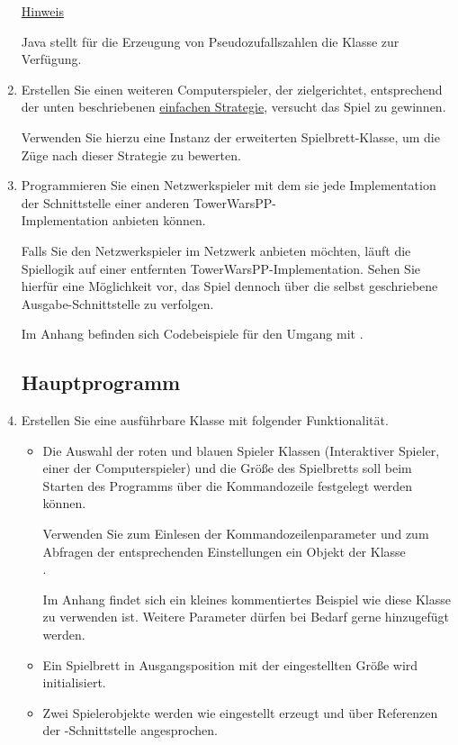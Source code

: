 \begin{enumerate}
\underline{Hinweis}

Java stellt für die Erzeugung von Pseudozufallszahlen die Klasse  zur Verfügung.

\item Erstellen Sie einen weiteren Computerspieler, der zielgerichtet, entsprechend der unten beschriebenen \hyperlink{strategy}{einfachen Strategie}, versucht das Spiel zu gewinnen.

Verwenden Sie hierzu eine Instanz der erweiterten Spielbrett-Klasse, um die Züge nach dieser Strategie zu bewerten.

\item Programmieren Sie einen Netzwerkspieler mit dem sie jede Implementation der Schnittstelle  einer anderen TowerWarsPP- \\Implementation anbieten können.

Falls Sie den Netzwerkspieler im Netzwerk anbieten möchten, läuft die Spiellogik auf einer entfernten TowerWarsPP-Implementation. Sehen Sie hierfür eine Möglichkeit vor, das Spiel dennoch über die selbst geschriebene Ausgabe-Schnittstelle zu verfolgen.

Im Anhang befinden sich Codebeispiele für den Umgang mit .

\subsection*{Hauptprogramm}
\item Erstellen Sie eine ausführbare Klasse mit folgender Funktionalität.
\begin{itemize}
\item Die Auswahl der roten und blauen Spieler Klassen (Interaktiver Spieler, einer der Computerspieler) und die Größe des Spielbretts soll beim Starten des Programms über die Kommandozeile festgelegt werden können.

Verwenden Sie zum Einlesen der Kommandozeilenparameter und zum Abfragen der entsprechenden Einstellungen ein Objekt der Klasse \\
.

Im Anhang findet sich ein kleines kommentiertes Beispiel wie diese Klasse zu verwenden ist. Weitere Parameter dürfen bei Bedarf gerne hinzugefügt werden.
\item Ein Spielbrett in Ausgangsposition mit der eingestellten Größe wird initialisiert.
\item Zwei Spielerobjekte werden wie eingestellt erzeugt und über Referenzen der -Schnittstelle angesprochen. 


\end{itemize}
\end{enumerate}
